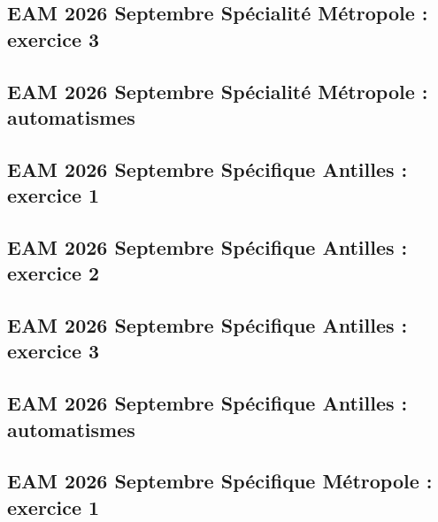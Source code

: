\documentclass[lang=fr,edition=teacher,layout=sheet]{mxbook}
\begin{document}
\par\bigskip
{}\subsection*{EAM 2026 Septembre Spécialité Métropole : exercice 3}
\begingroup\endgroup
\par\bigskip
{}\subsection*{EAM 2026 Septembre Spécialité Métropole : automatismes}
\begingroup\endgroup
\par\bigskip
{}\subsection*{EAM 2026 Septembre Spécifique Antilles : exercice 1}
\begingroup\endgroup
\par\bigskip
{}\subsection*{EAM 2026 Septembre Spécifique Antilles : exercice 2}
\begingroup\endgroup
\par\bigskip
{}\subsection*{EAM 2026 Septembre Spécifique Antilles : exercice 3}
\begingroup\endgroup
\par\bigskip
{}\subsection*{EAM 2026 Septembre Spécifique Antilles : automatismes}
\begingroup\endgroup
\par\bigskip
{}\subsection*{EAM 2026 Septembre Spécifique Métropole : exercice 1}
\end{document}

